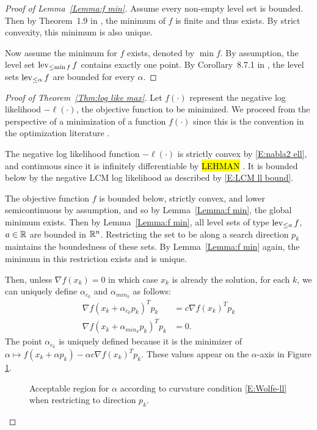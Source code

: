 
\begin{proof}[Proof of Lemma~\ref{Lemma:f min}]
Assume every non-empty level set is bounded.  Then by Theorem~1.9 in \citet
{Rockafellar}, the minimum of $f$ is finite 
and thus exists.  By strict convexity, this minimum is also unique.

Now assume the minimum for $f$ exists, denoted by $\min f$.  By assumption, the level 
set $\operatorname{lev}_{\leq \min f} f$ 
contains exactly one point.  By Corollary~8.7.1 in \citet{Rockafellar:1970}, the level 
sets $\operatorname{lev}_{\leq \alpha} f$ are 
bounded for every $\alpha$.  
\end{proof}


\begin{proof}[Proof of Theorem~\ref{Thm:log like max}]
Let $f(\cdot)$ represent the negative log likelihood $- \ell(\cdot)$, the objective 
function to be minimized.  We proceed from the perspective of a minimization of a 
function $f(\cdot)$ since this is the convention in the optimization literature \citep
{NW,Rockafellar}.  %

The negative log likelihood function $-\ell(\cdot)$ is strictly convex by 
\eqref{E:nabla2 ell}, and continuous since it is infinitely differentiable by 
\hl{LEHMAN} \citep{TPE2}.
It is bounded below by the negative LCM log likelihood as described by \eqref{E:LCM ll bound}.

The objective function $f$ is bounded below, strictly convex, and lower semicontinuous 
by assumption, and so by Lemma~\ref{Lemma:f min}, the global minimum exists.  
Then by Lemma~\ref{Lemma:f min}, all level sets of type $\operatorname{lev}_{\leq a} f$, $a \in {\mathbb R}$ are bounded in ${\mathbb R}^n$.  Restricting the set to be along a search 
direction $p_k$ maintains the 
boundedness of these sets.  By Lemma~\ref{Lemma:f min} again, the minimum in this 
restriction exists and is unique.     

Then, unless $\nabla f( x_k ) = 0$ in which case $x_k$ is already the solution, for 
each $k$, we can uniquely define $
\alpha_{c_k}$ and $\alpha_{min_k}$ as follows: 
\begin{align}
	\nabla f( x_k + \alpha_{c_k} p_k)^T p_k &= c \nabla f(x_k)^T p_k \label{E:alphac} 
\\
	\nabla f( x_k + \alpha_{min_k} p_k)^T p_k &= 0. \label{E:alphamin} 
\end{align}
The point $\alpha_{c_k}$ is uniquely defined because it is the minimizer of $\alpha 
\mapsto f( x_k + \alpha p_k) - 
\alpha c \nabla f( x_k )^T p_k$.
These values appear on the $\alpha$-axis in Figure \ref{F:Wolfe-mod}.
\begin{figure}
\centering
\scalebox{.4}{}
\caption{Acceptable region for $\alpha$ according to curvature condition 
\eqref{E:Wolfe-ll} when restricting to direction $p_k$.}
\label{F:Wolfe-mod}
\end{figure}


\end{proof}
